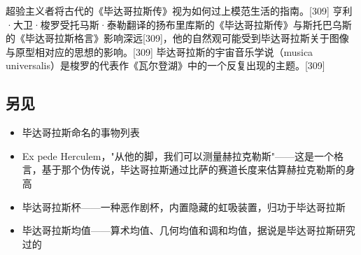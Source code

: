 超验主义者将古代的《毕达哥拉斯传》视为如何过上模范生活的指南。[309] 亨利·大卫·梭罗受托马斯·泰勒翻译的扬布里库斯的《毕达哥拉斯传》与斯托巴乌斯的《毕达哥拉斯格言》影响深远[309]，他的自然观可能受到毕达哥拉斯关于图像与原型相对应的思想的影响。[309] 毕达哥拉斯的宇宙音乐学说（musica universalis）是梭罗的代表作《瓦尔登湖》中的一个反复出现的主题。[309]
\subsection{另见}  
\begin{itemize}
\item 毕达哥拉斯命名的事物列表  
\item Ex pede Herculem，"从他的脚，我们可以测量赫拉克勒斯"——这是一个格言，基于那个伪传说，毕达哥拉斯通过比萨的赛道长度来估算赫拉克勒斯的身高  
\item 毕达哥拉斯杯——一种恶作剧杯，内置隐藏的虹吸装置，归功于毕达哥拉斯  
\item 毕达哥拉斯均值——算术均值、几何均值和调和均值，据说是毕达哥拉斯研究过的
\end{itemize}

